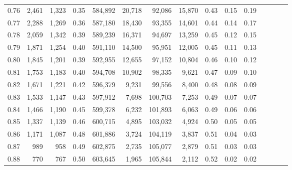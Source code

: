 \begin{tabular}{rrrcrrrrrrrrrrr}
0.76 &   2,461 &  1,323 &                                       0.35 &  584,892 &   20,718 &   92,086 &   15,870 &  0.43 &  0.15 &                         0.19 \\
0.77 &   2,288 &  1,269 &                                       0.36 &  587,180 &   18,430 &   93,355 &   14,601 &  0.44 &  0.14 &                         0.17 \\
0.78 &   2,059 &  1,342 &                                       0.39 &  589,239 &   16,371 &   94,697 &   13,259 &  0.45 &  0.12 &                         0.15 \\
0.79 &   1,871 &  1,254 &                                       0.40 &  591,110 &   14,500 &   95,951 &   12,005 &  0.45 &  0.11 &                         0.13 \\
0.80 &   1,845 &  1,201 &                                       0.39 &  592,955 &   12,655 &   97,152 &   10,804 &  0.46 &  0.10 &                         0.12 \\
0.81 &   1,753 &  1,183 &                                       0.40 &  594,708 &   10,902 &   98,335 &    9,621 &  0.47 &  0.09 &                         0.10 \\
0.82 &   1,671 &  1,221 &                                       0.42 &  596,379 &    9,231 &   99,556 &    8,400 &  0.48 &  0.08 &                         0.09 \\
0.83 &   1,533 &  1,147 &                                       0.43 &  597,912 &    7,698 &  100,703 &    7,253 &  0.49 &  0.07 &                         0.07 \\
0.84 &   1,466 &  1,190 &                                       0.45 &  599,378 &    6,232 &  101,893 &    6,063 &  0.49 &  0.06 &                         0.06 \\
0.85 &   1,337 &  1,139 &                                       0.46 &  600,715 &    4,895 &  103,032 &    4,924 &  0.50 &  0.05 &                         0.05 \\
0.86 &   1,171 &  1,087 &                                       0.48 &  601,886 &    3,724 &  104,119 &    3,837 &  0.51 &  0.04 &                         0.03 \\
0.87 &     989 &    958 &                                       0.49 &  602,875 &    2,735 &  105,077 &    2,879 &  0.51 &  0.03 &                         0.03 \\
0.88 &     770 &    767 &                                       0.50 &  603,645 &    1,965 &  105,844 &    2,112 &  0.52 &  0.02 &                         0.02 \\

\end{tabular}
